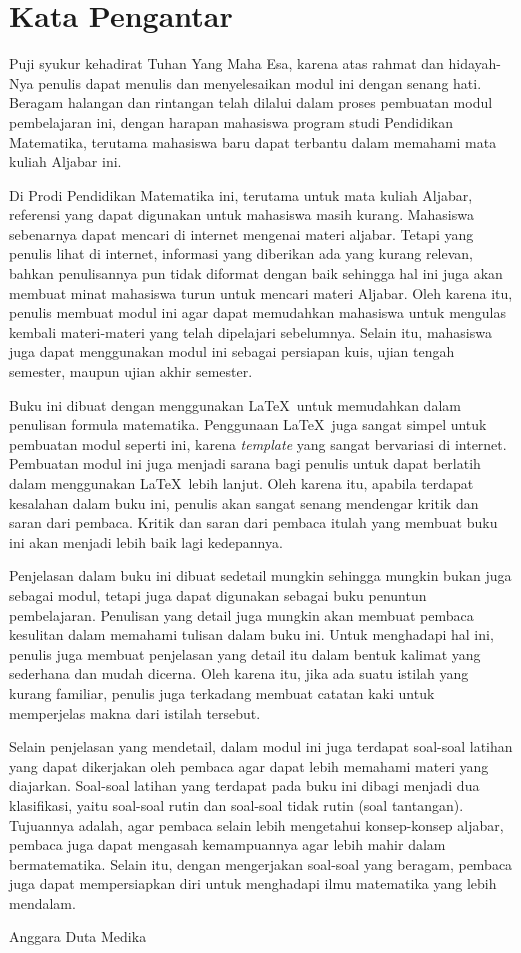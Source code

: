 \chapter{Kata Pengantar}

Puji syukur kehadirat Tuhan Yang Maha Esa, karena atas rahmat dan hidayah-Nya penulis dapat menulis dan menyelesaikan modul ini dengan senang hati. Beragam halangan dan rintangan telah dilalui dalam proses pembuatan modul pembelajaran ini, dengan harapan mahasiswa program studi Pendidikan Matematika, terutama mahasiswa baru dapat terbantu dalam memahami mata kuliah Aljabar ini.
\par Di Prodi Pendidikan Matematika ini, terutama untuk mata kuliah Aljabar, referensi yang dapat digunakan untuk mahasiswa masih kurang. Mahasiswa sebenarnya dapat mencari di internet mengenai materi aljabar. Tetapi yang penulis lihat di internet, informasi yang diberikan ada yang kurang relevan, bahkan penulisannya pun tidak diformat dengan baik sehingga hal ini juga akan membuat minat mahasiswa turun untuk mencari materi Aljabar. Oleh karena itu, penulis membuat modul ini agar dapat memudahkan mahasiswa untuk mengulas kembali materi-materi yang telah dipelajari sebelumnya. Selain itu, mahasiswa juga dapat menggunakan modul ini sebagai persiapan kuis, ujian tengah semester, maupun ujian akhir semester.
\par Buku ini dibuat dengan menggunakan \LaTeX\ untuk memudahkan dalam penulisan formula matematika. Penggunaan \LaTeX\ juga sangat simpel untuk pembuatan modul seperti ini, karena \textit{template} yang sangat bervariasi di internet. Pembuatan modul ini juga menjadi sarana bagi penulis untuk dapat berlatih dalam menggunakan \LaTeX\ lebih lanjut. Oleh karena itu, apabila terdapat kesalahan dalam buku ini, penulis akan sangat senang mendengar kritik dan saran dari pembaca. Kritik dan saran dari pembaca itulah yang membuat buku ini akan menjadi lebih baik lagi kedepannya.
\par Penjelasan dalam buku ini dibuat sedetail mungkin sehingga mungkin bukan juga sebagai modul, tetapi juga dapat digunakan sebagai buku penuntun pembelajaran. Penulisan yang detail juga mungkin akan membuat pembaca kesulitan dalam memahami tulisan dalam buku ini. Untuk menghadapi hal ini, penulis juga membuat penjelasan yang detail itu dalam bentuk kalimat yang sederhana dan mudah dicerna. Oleh karena itu, jika ada suatu istilah yang kurang familiar, penulis juga terkadang membuat catatan kaki untuk memperjelas makna dari istilah tersebut.
\par Selain penjelasan yang mendetail, dalam modul ini juga terdapat soal-soal latihan yang dapat dikerjakan oleh pembaca agar dapat lebih memahami materi yang diajarkan. Soal-soal latihan yang terdapat pada buku ini dibagi menjadi dua klasifikasi, yaitu soal-soal rutin dan soal-soal tidak rutin (soal tantangan). Tujuannya adalah, agar pembaca selain lebih mengetahui konsep-konsep aljabar, pembaca juga dapat mengasah kemampuannya agar lebih mahir dalam bermatematika. Selain itu, dengan mengerjakan soal-soal yang beragam, pembaca juga dapat mempersiapkan diri untuk menghadapi ilmu matematika yang lebih mendalam.

\vspace{1cm}

\hspace{7.5cm} Anggara Duta Medika